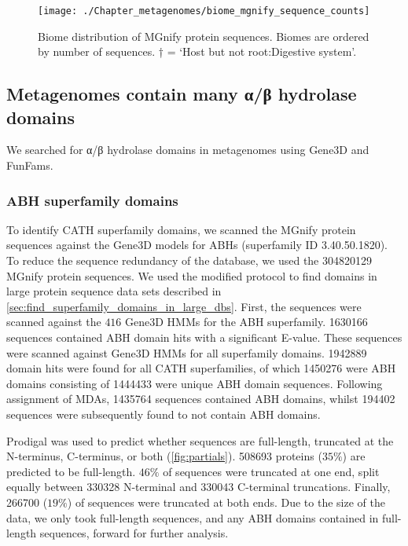 \begin{figure}[!hbt]
    \centering
    \texttt{[image: ./Chapter\_metagenomes/biome\_mgnify\_sequence\_counts]}
    \caption{%
        Biome distribution of MGnify protein sequences.
        Biomes are ordered by number of sequences.
        † = `Host but not root:Digestive system'.
    }
    \label{fig:biome_mgnify_sequence_counts}
\end{figure}

\subsection{Metagenomes contain many α/β hydrolase domains}

We searched for α/β hydrolase domains in metagenomes using Gene$3$D and FunFams.

\subsubsection{ABH superfamily domains}

To identify CATH superfamily domains, we scanned the MGnify protein sequences against the Gene$3$D models for ABHs (superfamily ID 3.40.50.1820). To reduce the sequence redundancy of the database, we used the \num{304820129} MGnify protein sequences. We used the modified protocol to find domains in large protein sequence data sets described in \ref{sec:find_superfamily_domains_in_large_dbs}. First, the sequences were scanned against the $416$ Gene$3$D HMMs for the ABH superfamily. \num{1630166} sequences contained ABH domain hits with a significant E-value. These sequences were scanned against Gene$3$D HMMs for all superfamily domains. \num{1942889} domain hits were found for all CATH superfamilies, of which \num{1450276} were ABH domains consisting of \num{1444433} were unique ABH domain sequences. Following assignment of MDAs, \num{1435764} sequences contained ABH domains, whilst \num{194402} sequences were subsequently found to not contain ABH domains.

Prodigal was used to predict whether sequences are full-length, truncated at the N-terminus, C-terminus, or both (\ref{fig:partials}). \num{508693} proteins ($35\%$) are predicted to be full-length. $46\%$ of sequences were truncated at one end, split equally between \num{330328} N-terminal and \num{330043} C-terminal truncations. Finally, \num{266700} ($19\%$) of sequences were truncated at both ends. Due to the size of the data, we only took full-length sequences, and any ABH domains contained in full-length sequences, forward for further analysis.

